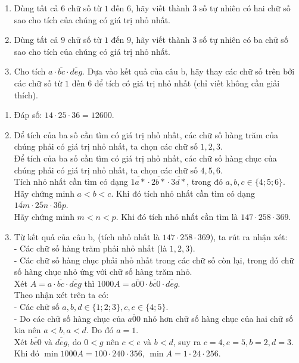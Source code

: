 \begin{bt}
\begin{enumerate}
  \item Dùng tất cả $6$ chữ số từ $1$ đến $6$, hãy viết thành $3$ số tự nhiên có hai chữ số sao cho tích của chúng có giá trị nhỏ nhất.
  \item Dùng tất cả $9$ chữ số từ $1$ đến $9$, hãy viết thành $3$ số tự nhiên có ba chữ số sao cho tích của chúng có giá trị nhỏ nhất.
  \item Cho tích $a\cdot \overline{bc}\cdot \overline{deg}$. Dựa vào kết quả của câu b, hãy thay các chữ số trên bởi các chữ số từ $1$ đến $6$ để tích có giá trị nhỏ nhất (chỉ viết không cần giải thích).
\end{enumerate}
\loigiai
{
\begin{enumerate}
  \item Đáp số: $14\cdot 25\cdot 36=12600$.
  \item Để tích của ba số cần tìm có giá trị nhỏ nhất, các chữ số hàng trăm của chúng phải có giá trị nhỏ nhất, ta chọn các chữ số $1,2,3$.\\
  Để tích của ba số cần tìm có giá trị nhỏ nhất, các chữ số hàng chục của chúng phải có giá trị nhỏ nhất, ta chọn các chữ số $4,5,6$.\\
  Tích nhỏ nhất cần tìm có dạng $\overline{1a*}\cdot \overline{2b*}\cdot \overline{3d*}$, trong đó $a, b, c\in\{4;5;6\}$.\\
  Hãy chứng minh $a<b<c$. Khi đó tích nhỏ nhất cần tìm có dạng  $\overline{14m}\cdot \overline{25n}\cdot \overline{36p}$.\\
  Hãy chứng minh $m<n<p$. Khi đó tích nhỏ nhất cần tìm là $147\cdot 258\cdot 369$.
  \item Từ kết quả của câu b, (tích nhỏ nhất là $147\cdot 258\cdot 369$), ta rút ra nhận xét:\\
  - Các chữ số hàng trăm phải nhỏ nhất (là $1,2,3$).\\
  - Các chữ số hàng chục phải nhỏ nhất trong các chữ số còn lại, trong đó chữ số hàng chục nhỏ ứng với chữ số hàng trăm nhỏ.\\
  Xét $A=a\cdot \overline{bc}\cdot \overline{deg}$ thì $1000A=\overline{a00}\cdot \overline{bc0}\cdot \overline{deg}$.\\
  Theo nhận xét trên ta có: \\
  - Các chữ số $a, b, d\in\{1;2;3\}, c,e\in\{4;5\}$.\\
  - Do các chữ số hàng chục của $\overline{a00}$ nhỏ hơn chữ số hàng chục của hai chữ số kia nên $a<b, a<d$. Do đó $a=1$.\\
  Xét $\overline{bc0}$ và $\overline{deg}$, do $0<g$ nên $c<e$ và $b<d$, suy ra $c=4, e=5, b=2, d=3$.\\
  Khi đó $\min 1000A=100\cdot 240\cdot 356$, $\min A=1\cdot24\cdot 256$.
\end{enumerate}
}
\end{bt}
